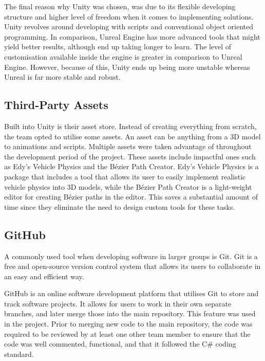         The final reason why Unity was chosen, was due to its flexible developing structure and higher level of freedom when it comes to implementing solutions. Unity revolves around developing with scripts and conventional object oriented programming. In comparison, Unreal Engine has more advanced tools that might yield better results, although end up taking longer to learn. The level of customisation available inside the engine is greater in comparison to Unreal Engine. However, because of this, Unity ends up being more unstable whereas Unreal is far more stable and robust.

    \subsection{Third-Party Assets}
        Built into Unity is their asset store. Instead of creating everything from scratch, the team opted to utilise some assets. An asset can be anything from a 3D model to animations and scripts. Multiple assets were taken advantage of throughout the development period of the project. These assets include impactful ones such as Edy's Vehicle Physics and the Bézier Path Creator\cite{bpc}. Edy's Vehicle Physics is a package that includes a tool that allows its user to easily implement realistic vehicle physics into 3D models, while the Bézier Path Creator is a light-weight editor for creating Bézier paths in the editor. This saves a substantial amount of time since they eliminate the need to design custom tools for these tasks.

    \subsection{GitHub}
        A commonly used tool when developing software in larger groups is Git\cite{git}. Git is a free and open-source version control system that allows its users to collaborate in an easy and efficient way. 

        GitHub\cite{github} is an online software development platform that utilises Git to store and track software projects. It allows for users to work in their own separate branches, and later merge those into the main repository. This feature was used in the project. Prior to merging new code to the main repository, the code was required to be reviewed by at least one other team member to ensure that the code was well commented, functional, and that it followed the C\# coding standard.


